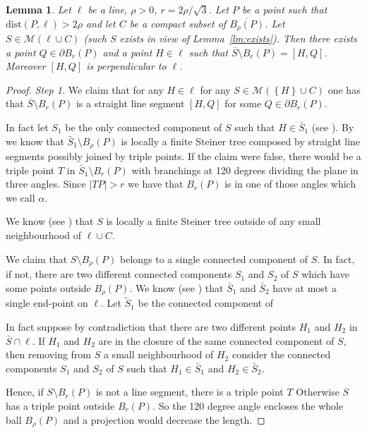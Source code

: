 \documentclass{article}
\newcommand{\abs}[1]{\left\vert #1 \right\vert}
\newcommand{\ENCLOSE}[1]{\left\{#1\right\}}
\newcommand{\M}{\mathcal{M}}
\newcommand{\dist}{\mathrm{dist}}
\newtheorem{lemma}[theorem]{Lemma}
\theoremstyle{definition}
\theoremstyle{remark}
\begin{document}
\begin{lemma}\label{lm:base}
  Let $\ell$ be a line, $\rho>0$, 
  $r=2\rho/\sqrt 3$.
  Let $P$ be a point such that $\dist(P,\ell)>2\rho$
  and let $C$ be a compact subset of $\overline{B_\rho(P)}$.
  Let $S \in \M(\ell\cup C)$ 
  (such $S$ exists in view of Lemma~\ref{lm:exists}).
  Then there exists a point $Q\in \partial B_r(P)$ 
  and a point $H\in \ell$
  such that $\bar S\setminus B_r(P) = [H,Q]$.
  Moreover $[H,Q]$ is perpendicular to $\ell$.
\end{lemma}
\begin{proof}
  \emph{Step 1.} We claim that for any $H\in \ell$ for any $S\in \M(\ENCLOSE{H} \cup C)$
  one has that $\bar S\setminus B_r(P)$ is a straight line segment $[H,Q]$ 
  for some $Q\in \partial B_r(P)$.

  In fact let $S_1$ be the only connected component of $S$ such that 
  $H\in \bar S_1$ (see \cite{PaoSte}).
  By \cite{PaoSte} we know that $\bar S_1\setminus B_\rho(P)$ is locally 
  a finite Steiner tree composed by straight line segments possibly joined 
  by triple points.
  If the claim were false, there would be a triple point $T$
  in $\bar S_1\setminus B_r(P)$ with branchings at 120 degrees dividing 
  the plane in three angles.
  Since $\abs{TP}>r$ we have that $B_r(P)$ is in one of those angles 
  which we call $\alpha$.



   


  We know (see \cite{PaoSte}) that $S$ is locally a finite Steiner tree 
  outside of any small neighbourhood of $\ell\cup C$.
  
  We claim that $S\setminus B_\rho(P)$ belongs to 
  a single connected component of $S$. 
  In fact, if not, there are two different connected components 
  $S_1$ and $S_2$ of $S$ which have some points outside $B_\rho(P)$. 
  We know (see \cite{PaoSte}) that $\bar S_1$ and $\bar S_2$ have 
  at most a single end-point on $\ell$. 
  Let $\tilde S_1$ be the connected component of
  
  In fact suppose by contradiction that there are two different 
  points $H_1$ and $H_2$ in $\bar S\cap \ell$. 
  If $H_1$ and $H_2$ are in the closure of the same connected component 
  of $S$, then removing from $S$ a small neighbourhood of $H_2$ 
  consider the connected components $S_1$ and $S_2$ 
  of $S$ such that $H_1\in \bar S_1$ and $H_2\in \bar S_2$.

  Hence, if $S\setminus B_r(P)$ is not a line segment,
  there is a triple point $T$ 
  Otherwise $S$ has a triple point outside $B_r(P)$.
  So the 120 degree angle encloses the whole ball $B_\rho(P)$ 
  and a projection would decrease the length.
\end{proof}
  
\end{document}
